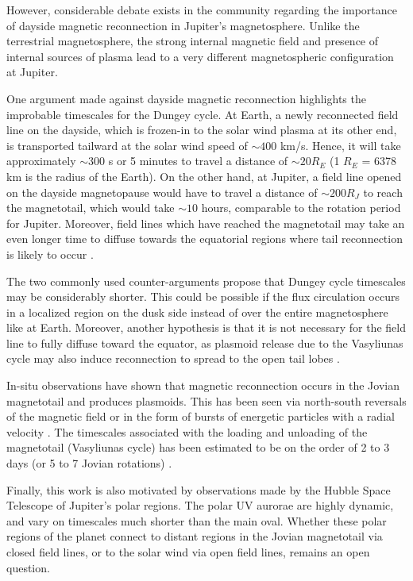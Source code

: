 However, considerable debate exists in the community regarding the importance of dayside magnetic reconnection in Jupiter's magnetosphere. Unlike the terrestrial magnetosphere, the strong internal magnetic field and presence of internal sources of plasma lead to a very different magnetospheric configuration at Jupiter.

One argument made against dayside magnetic reconnection highlights the improbable timescales for the Dungey cycle. At Earth, a newly reconnected field line on the dayside, which is frozen-in to the solar wind plasma at its other end, is transported tailward at the solar wind speed of $\sim400$ km/s. Hence, it will take approximately $\sim$300 s or 5 minutes to travel a distance of $\sim20 R_E$ (1 $R_E$ = 6378 km is the radius of the Earth). On the other hand, at Jupiter, a field line opened on the dayside magnetopause would have to travel a distance of $\sim200 R_J$ to reach the magnetotail, which would take  $\sim10$ hours, comparable to the rotation period for Jupiter. Moreover, field lines which have reached the magnetotail may take an even longer time to diffuse towards the equatorial regions where tail reconnection is likely to occur \cite{McComas2007}. 

The two commonly used counter-arguments propose that Dungey cycle timescales may be considerably shorter. This could be possible if the flux circulation occurs in a localized region on the dusk side instead of over the entire magnetosphere like at Earth. Moreover, another hypothesis is that it is not necessary for the field line to fully diffuse toward the equator, as plasmoid release due to the Vasyliunas cycle may also induce reconnection to spread to the open tail lobes \cite{Cowley2008}. 

In-situ observations have shown that magnetic reconnection occurs in the Jovian magnetotail and produces plasmoids. This has been seen via north-south reversals of the magnetic field \cite{Vogt2010a,Vogt2014,Vogt2020MagnetotailObservations} or in the form of bursts of energetic particles with a radial velocity \cite{Woch2002a,Kronberg2007AMagnetosphere,Kronberg2008MassParameters}. The timescales associated with the loading and unloading of the magnetotail (Vasyliunas cycle) has been estimated to be on the order of 2 to 3 days (or 5 to 7 Jovian rotations) \cite{Woch2002a,Vogt2010a}.

Finally, this work is also motivated by observations made by the Hubble Space Telescope of Jupiter's polar regions. The polar UV aurorae are highly dynamic, and vary on timescales much shorter than the main oval. Whether these polar regions of the planet connect to distant regions in the Jovian magnetotail via closed field lines, or to the solar wind via open field lines, remains an open question. 

